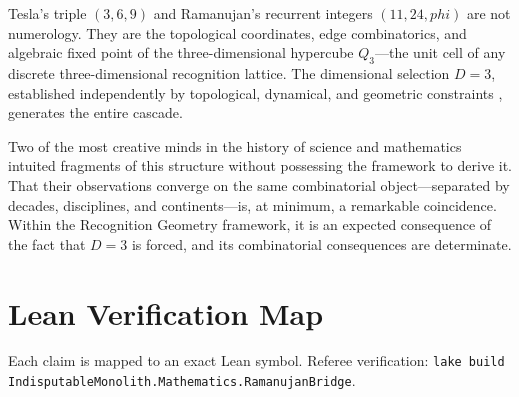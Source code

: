\documentclass[11pt]{article}
\def\phig{phi}
\theoremstyle{plain}
\theoremstyle{definition}
\theoremstyle{remark}
\newcommand{\phig}{\varphi}
\begin{document}
Tesla's triple $(3, 6, 9)$ and Ramanujan's recurrent integers $(11, 24, \phig)$ are not numerology.
They are the topological coordinates, edge combinatorics, and algebraic fixed point of the three-dimensional hypercube $Q_3$---the unit cell of any discrete three-dimensional recognition lattice.
The dimensional selection $D = 3$, established independently by topological, dynamical, and geometric constraints \cite{PardoGuerraThapa2026}, generates the entire cascade.

Two of the most creative minds in the history of science and mathematics intuited fragments of this structure without possessing the framework to derive it.
That their observations converge on the same combinatorial object---separated by decades, disciplines, and continents---is, at minimum, a remarkable coincidence.
Within the Recognition Geometry framework, it is an expected consequence of the fact that $D = 3$ is forced, and its combinatorial consequences are determinate.

\appendix
\section{Lean Verification Map}
\label{app:lean}

Each claim is mapped to an exact Lean symbol.
Referee verification: \texttt{lake build IndisputableMonolith.Mathematics.RamanujanBridge}.
\end{document}
